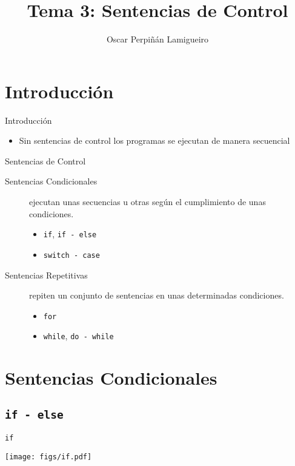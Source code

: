 \documentclass[xcolor={usenames,svgnames,dvipsnames}, aspectratio=169]{beamer}
\author{Oscar Perpiñán Lamigueiro}
\date{}
\title{Tema 3: Sentencias de Control}
\begin{document}
\maketitle

\section{Introducción}
\label{sec:org68e7009}
\begin{frame}[label={sec:orge55b534},fragile]{Introducción}
 \begin{itemize}
\item Sin sentencias de control los programas se ejecutan de manera secuencial
\end{itemize}
\begin{block}{Sentencias de Control}
\begin{description}
\item[{Sentencias Condicionales}] ejecutan unas secuencias u otras según el cumplimiento de unas condiciones.
\begin{itemize}
\item \texttt{if}, \texttt{if - else}
\item \texttt{switch - case}
\end{itemize}
\item[{Sentencias Repetitivas}] repiten un conjunto de sentencias en unas determinadas condiciones.
\begin{itemize}
\item \texttt{for}
\item \texttt{while}, \texttt{do - while}
\end{itemize}
\end{description}
\end{block}
\end{frame}
\section{Sentencias Condicionales}
\label{sec:org2c76bbb}
\subsection{\texttt{if - else}}
\label{sec:org60af960}
\begin{frame}[label={sec:orgc48a874},fragile]{\texttt{if}}
 \begin{center}
\texttt{[image: figs/if.pdf]}
\end{center}
\end{frame}
\end{document}
